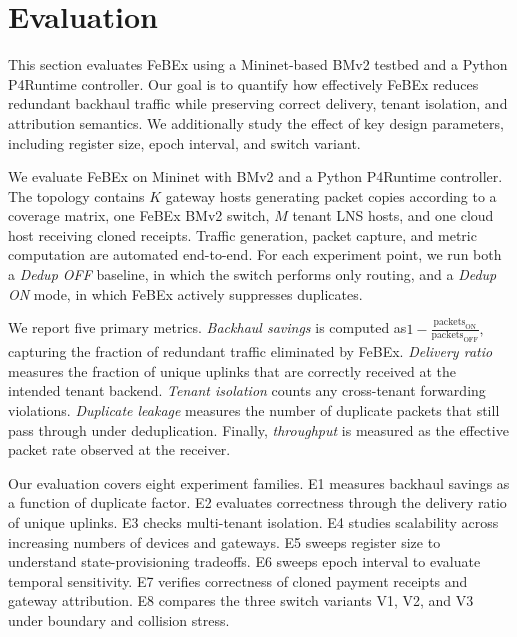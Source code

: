 \section{Evaluation}
\label{sec:evaluation}

This section evaluates FeBEx using a Mininet-based BMv2 testbed and a Python P4Runtime controller. Our goal is to quantify how effectively FeBEx reduces redundant backhaul traffic while preserving correct delivery, tenant isolation, and attribution semantics. We additionally study the effect of key design parameters, including register size, epoch interval, and switch variant.

We evaluate FeBEx on Mininet with BMv2 and a Python P4Runtime controller. The topology contains $K$ gateway hosts generating packet copies according to a coverage matrix, one FeBEx BMv2 switch, $M$ tenant LNS hosts, and one cloud host receiving cloned receipts. Traffic generation, packet capture, and metric computation are automated end-to-end. For each experiment point, we run both a \textit{Dedup OFF} baseline, in which the switch performs only routing, and a \textit{Dedup ON} mode, in which FeBEx actively suppresses duplicates.

We report five primary metrics. \textit{Backhaul savings} is computed as$1 - \frac{\text{packets}_{\text{ON}}}{\text{packets}_{\text{OFF}}},$
capturing the fraction of redundant traffic eliminated by FeBEx. \textit{Delivery ratio} measures the fraction of unique uplinks that are correctly received at the intended tenant backend. \textit{Tenant isolation} counts any cross-tenant forwarding violations. \textit{Duplicate leakage} measures the number of duplicate packets that still pass through under deduplication. Finally, \textit{throughput} is measured as the effective packet rate observed at the receiver.


Our evaluation covers eight experiment families. E1 measures backhaul savings as a function of duplicate factor. E2 evaluates correctness through the delivery ratio of unique uplinks. E3 checks multi-tenant isolation. E4 studies scalability across increasing numbers of devices and gateways. E5 sweeps register size to understand state-provisioning tradeoffs. E6 sweeps epoch interval to evaluate temporal sensitivity. E7 verifies correctness of cloned payment receipts and gateway attribution. E8 compares the three switch variants V1, V2, and V3 under boundary and collision stress.

